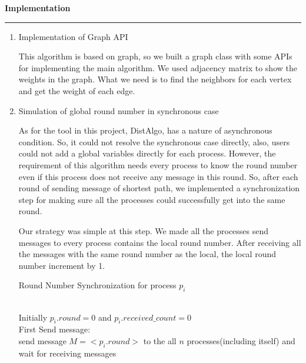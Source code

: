 \documentclass[11pt]{article}  %
\begin{document}

\newpage
\noindent
{\bf Implementation}

\rule{6in}{.1pt}       %

\begin{enumerate}
    \item Implementation of Graph API
    
    This algorithm is based on graph, so we built a graph class with some APIs for implementing the main algorithm.
    We used adjacency matrix to show the weights in the graph. What we need is to find the neighbors for each vertex and get the weight of each edge.
    
    \item Simulation of global round number in synchronous case
    
    As for the tool in this project, DistAlgo, has a nature of asynchronous condition. So, it could not resolve the synchronous case directly, also, users could not add a global variables directly for each process. However, the requirement of this algorithm needs every process to know the round number even if this process does not receive any message in this round. So, after each round of sending message of shortest path, we implemented a synchronization step for making sure all the processes could successfully get into the same round. 
    
    Our strategy was simple at this step. We made all the processes send messages to every process contains the local round number. After receiving all the messages with the same round number as the local, the local round number increment by 1. 
    
    \begin{algorithm}[htb] 
    \caption{Round Number Synchronization for process $p_i$} 
    \label{alg:Framwork} 
    \begin{algorithmic}[1] %
    \REQUIRE ~~\\ %
    Initially $p_i.round = 0$ and $p_i.received\_count = 0$ \\
    First Send message:\\
    \STATE send message $M = <p_i.round>$ to the all $n$ processes(including itself) and wait for receiving messages
    

\end{algorithmic}
\end{algorithm}
\end{enumerate}
\end{document}
